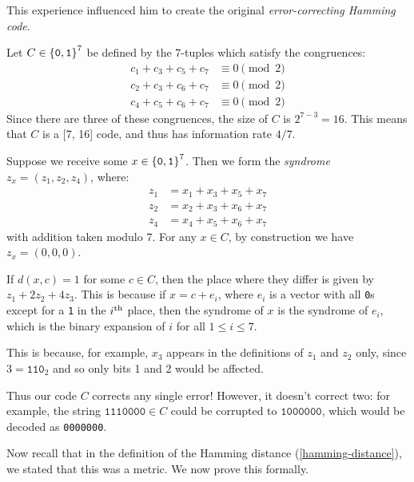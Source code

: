 \documentclass{article}
\begin{document}
This experience influenced  him to create the original \textit{error-correcting Hamming code}.

\begin{example}
    Let $C \in \left\lbrace \texttt{0}, \texttt{1} \right\rbrace^7$ be defined by the 7-tuples which satisfy the congruences:
    \begin{align*}
    	c_1 + c_3 + c_5 + c_7 &\equiv 0 \pmod 2 \\
    	c_2 + c_3 + c_6 + c_7 &\equiv 0 \pmod 2 \\
    	c_4 + c_5 + c_6 + c_7 &\equiv 0 \pmod 2
	\end{align*}
	Since there are three of these congruences, the size of $C$ is $2^{7-3} = 16$. This means that $C$ is a [7, 16] code, and thus has information rate $4/7$.
	
	Suppose we receive some $x \in \left\lbrace \texttt{0}, \texttt{1} \right\rbrace^7$. Then we form the \textit{syndrome} $z_x = (z_1, z_2, z_4)$, where:
	\begin{align*}
    	z_1 &= x_1 + x_3 + x_5 + x_7 \\
    	z_2 &= x_2 + x_3 + x_6 + x_7 \\
    	z_4 &= x_4 + x_5 + x_6 + x_7
	\end{align*}
	with addition taken modulo 7. For any $x \in C$, by construction we have $z_x = (0, 0, 0)$.
	
	If $d(x, c) = 1$ for some $c \in C$, then the place where they differ is given by $z_1 + 2z_2 + 4z_3$. This is because if $x = c + e_i$, where $e_i$ is a vector with all \texttt{0}s except for a \texttt{1} in the $i^{\text{th}}$ place, then the syndrome of $x$ is the syndrome of $e_i$, which is the binary expansion of $i$ for all $1 \leq i \leq 7$.
	
	This is because, for example, $x_3$ appears in the definitions of $z_1$ and $z_2$ only, since $3 = \texttt{110}_2$ and so only bits 1 and 2 would be affected.
	
	Thus our code $C$ corrects any single error! However, it doesn't correct two: for example, the string $\texttt{1110000} \in C$ could be corrupted to $\texttt{1000000}$, which would be decoded as \texttt{0000000}.
\end{example}

Now recall that in the definition of the Hamming distance (\ref{hamming-distance}), we stated that this was a metric. We now prove this formally.
\end{document}
